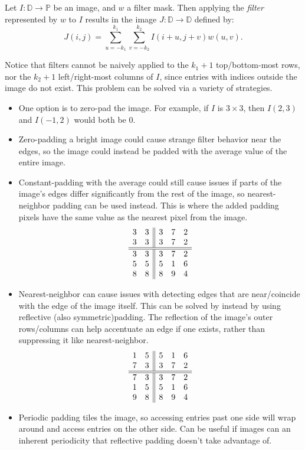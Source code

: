 \documentclass[12pt]{article}
\begin{document}
\begin{defn}
    Let $I: \mathbb{D} \to \mathbb{P}$ be an image, and $w$ a filter mask. Then applying the \emph{filter} represented by $w$ to $I$ results in the image $J: \mathbb{D} \to \mathbb{D}$ defined by: \[J(i, j) = \sum_{u = -k_1}^{k_1}\sum_{v = -k_2}^{k_2}I(i + u, j + v)w(u, v).\]
\end{defn}

Notice that filters cannot be naively applied to the $k_1 + 1$ top/bottom-most rows, nor the $k_2 + 1$ left/right-most columns of $I$, since entries with indices outside the image do not exist. This problem can be solved via a variety of strategies.
\begin{itemize}
    \item One option is to zero-pad the image. For example, if $I$ is $3 \times 3$, then $I(2, 3)$ and $I(-1, 2)$ would both be $0$.
    \item Zero-padding a bright image could cause strange filter behavior near the edges, so the image could instead be padded with the average value of the entire image.
    \item Constant-padding with the average could still cause issues if parts of the image's edges differ significantly from the rest of the image, so nearest-neighbor padding can be used instead. This is where the added padding pixels have the same value as the nearest pixel from the image.
    \[\begin{array}{c c||c c c}
        3 & 3 & 3 & 7 & 2 \\
        3 & 3 & 3 & 7 & 2\\
        \hline \hline
        3 & 3 & 3 & 7 & 2 \\
        5 & 5 & 5 & 1 & 6 \\
        8 & 8 & 8 & 9 & 4 \\
    \end{array}\]
    \item Nearest-neighbor can cause issues with detecting edges that are near/coincide with the edge of the image itself. This can be solved by instead by using reflective (also symmetric)padding. The reflection of the image's outer rows/columns can help accentuate an edge if one exists, rather than suppressing it like nearest-neighbor.
    \[\begin{array}{c c||c c c}
        1 & 5 & 5 & 1 & 6 \\
        7 & 3 & 3 & 7 & 2\\
        \hline \hline
        7 & 3 & 3 & 7 & 2 \\
        1 & 5 & 5 & 1 & 6 \\
        9 & 8 & 8 & 9 & 4 \\
    \end{array}\]
    \item Periodic padding tiles the image, so accessing entries past one side will wrap around and access entries on the other side. Can be useful if images can an inherent periodicity that reflective padding doesn't take advantage of.
\end{itemize}
\end{document}
